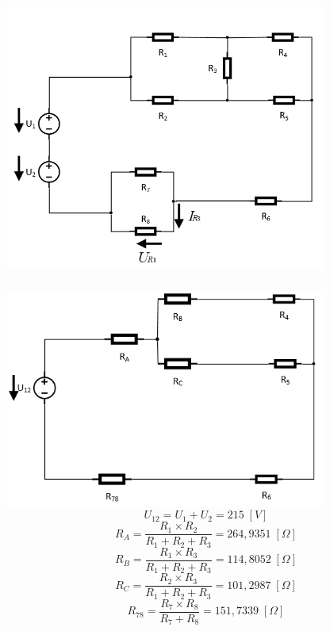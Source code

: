 \documentclass[a4paper,12pt]{article}
\begin{document}
		\subsubsection{} %
			\includegraphics[width=400px]{1_1.png}
			\pagebreak
		\subsubsection{} %
			\includegraphics[width=400px]{1_2.png}
			\begin{equation}
				U_{12} = U_1 + U_2 = 215 \;[V]\nonumber
			\end{equation}
			\begin{equation}
				R_A = \frac{R_1 \times R_2}{R_1 + R_2 + R_3} = 264,9351 \;[\Omega]\nonumber
			\end{equation}
			\begin{equation}
				R_B = \frac{R_1 \times R_3}{R_1 + R_2 + R_3} = 114,8052 \;[\Omega]\nonumber
			\end{equation}
			\begin{equation}
				R_C = \frac{R_2 \times R_3}{R_1 + R_2 + R_3} = 101,2987 \;[\Omega]\nonumber
		\end{equation}
		\begin{equation}
			R_{78} = \frac{R_7 \times R_8}{R_7 + R_8} = 151,7339 \;[\Omega]\nonumber
		\end{equation}
\end{document}

